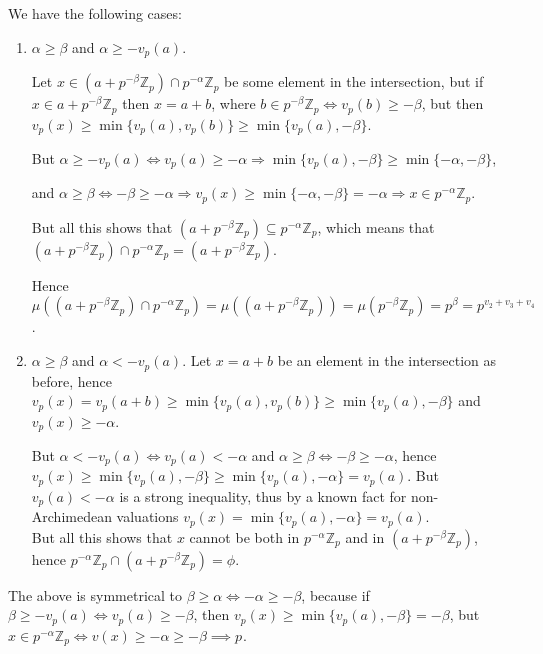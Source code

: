 \documentclass{article}
\begin{document}
We have the following cases:
\begin{enumerate}
    \item $\alpha\geq\beta$ and $\alpha\geq-v_p(a)$.

Let $x\in{\left(a+p^{-\beta}\mathbb{Z}_p\right)\cap{p^{-\alpha}\mathbb{Z}_p}}$ be some element in the intersection, but if $x\in{a+p^{-\beta}\mathbb{Z}_p}$ then $x=a+b$, where $b\in{p^{-\beta}\mathbb{Z}_p}\iff{v_p(b)\geq{-\beta}}$, but then $v_p(x)\geq\min\{v_p(a),v_p(b)\}\geq\min\{v_p(a),-\beta\}$.

But $\alpha\geq-v_p(a)\iff{v_p(a)\geq-\alpha}\Rightarrow\min\{v_p(a),-\beta\}\geq\min\{-\alpha,-\beta\}$,

and $\alpha\geq\beta\iff-\beta\geq-\alpha\Rightarrow{v_p(x)\geq\min\{-\alpha,-\beta\}=-\alpha}\Rightarrow{x\in{p^{-\alpha}\mathbb{Z}_p}}$.

But all this shows that $\left(a+p^{-\beta}\mathbb{Z}_p\right)\subseteq{p^{-\alpha}\mathbb{Z}_p}$, which means that \\
$\left(a+p^{-\beta}\mathbb{Z}_p\right)\cap{p^{-\alpha}\mathbb{Z}_p}=\left(a+p^{-\beta}\mathbb{Z}_p\right)$.

Hence $\mu\left(\left(a+p^{-\beta}\mathbb{Z}_p\right)\cap{p^{-\alpha}\mathbb{Z}_p}\right)=\mu\left(\left(a+p^{-\beta}\mathbb{Z}_p\right)\right)=\mu(p^{-\beta}\mathbb{Z}_p)=p^{\beta}=p^{v_2+v_3+v_4}$.\\
\item $\alpha\geq\beta$ and $\alpha<-v_p(a)$.
Let $x=a+b$ be an element in the intersection as before, hence $v_p(x)=v_p(a+b)\geq\min\{v_p(a),v_p(b)\}\geq\min\{v_p(a),-\beta\}$ and $v_p(x)\geq-\alpha$.

But $\alpha<-v_p(a)\iff{v_p(a)<-\alpha}$ and $\alpha\geq\beta\iff-\beta\geq-\alpha$, hence $v_p(x)\geq\min\{v_p(a),-\beta\}\geq\min\{v_p(a),-\alpha\}=v_p(a)$. But $v_p(a)<-\alpha$ is a strong inequality, thus by a known fact for non-Archimedean valuations $v_p(x)=\min\{v_p(a),-\alpha\}=v_p(a)$.\\
But all this shows that $x$ cannot be both in $p^{-\alpha}\mathbb{Z}_p$ and in $\left(a+p^{-\beta}\mathbb{Z}_p\right)$, hence $p^{-\alpha}\mathbb{Z}_p\cap\left(a+p^{-\beta}\mathbb{Z}_p\right)=\phi$.
\end{enumerate}
The above is symmetrical to $\beta\geq\alpha\iff-\alpha\geq-\beta$, because if $\beta\geq-v_p(a)\iff{v_p(a)}\geq-\beta$, then $v_p(x)\geq\min\{v_p(a),-\beta\}=-\beta$, but $x\in{p}^{-\alpha}\mathbb{Z}_p\iff{v(x)}\geq-\alpha\geq-\beta\implies{p}^{}$.\\
\end{document}

